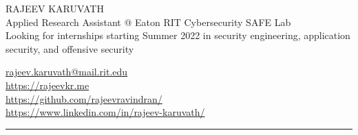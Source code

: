 \documentclass[letterpaper]{deedy-resume} %
\begin{document}

\begin{minipage}[t]{0.50\textwidth}

\begin{flushleft}
\Huge{}\uppercase{Rajeev Karuvath} \\
\sectionspace
\small{Applied Research Assistant @ Eaton RIT Cybersecurity SAFE Lab} \\
\sectionspace
{}\scriptsize{Looking for internships starting Summer 2022 in security engineering, application security, and offensive security}
\end{flushleft}

\end{minipage}
\begin{minipage}[t]{0.40\textwidth}
\begin{flushright}
\small
\href{mailto:rk3824@rit.edu}{rajeev.karuvath@mail.rit.edu}  \faEnvelope \\
\url{https://rajeevkr.me}  \faChrome \\
\url{https://github.com/rajeevravindran/}  \faGithub  \\
\url{https://www.linkedin.com/in/rajeev-karuvath/}  \faLinkedin  \\

\end{flushright}
\end{minipage}
\sectionspace
\begin{hline}
\noindent\rule{\textwidth}{1pt}
\end{hline}

\end{document}
